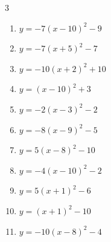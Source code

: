 \begin{multicols}{3}
\begin{enumerate}
        \phantom{$\displaystyle 頂点\left( 8 , -4 \right)$}

  \item $\displaystyle y=-7\left( x-10\right)^{2}-9$

        \phantom{$\displaystyle 頂点\left( 10 , -9 \right)$}

  \item $\displaystyle y=-7\left( x+5\right)^{2}-7$

        \phantom{$\displaystyle 頂点\left( -5 , -7 \right)$}

  \item $\displaystyle y=-10\left( x+2\right)^{2}+10$

        \phantom{$\displaystyle 頂点\left( -2 , 10 \right)$}

  \item $\displaystyle y=\left( x-10\right)^{2}+3$

        \phantom{$\displaystyle 頂点\left( 10 , 3 \right)$}

  \item $\displaystyle y=-2\left( x-3\right)^{2}-2$

        \phantom{$\displaystyle 頂点\left( 3 , -2 \right)$}

  \item $\displaystyle y=-8\left( x-9\right)^{2}-5$

        \phantom{$\displaystyle 頂点\left( 9 , -5 \right)$}

  \item $\displaystyle y=5\left( x-8\right)^{2}-10$

        \phantom{$\displaystyle 頂点\left( 8 , -10 \right)$}

  \item $\displaystyle y=-4\left( x-10\right)^{2}-2$

        \phantom{$\displaystyle 頂点\left( 10 , -2 \right)$}

  \item $\displaystyle y=5\left( x+1\right)^{2}-6$

        \phantom{$\displaystyle 頂点\left( -1 , -6 \right)$}

  \item $\displaystyle y=\left( x+1\right)^{2}-10$

        \phantom{$\displaystyle 頂点\left( -1 , -10 \right)$}

  \item $\displaystyle y=-10\left( x-8\right)^{2}-4$

        \phantom{$\displaystyle 頂点\left( 8 , -4 \right)$}


\end{enumerate}
\end{multicols}
